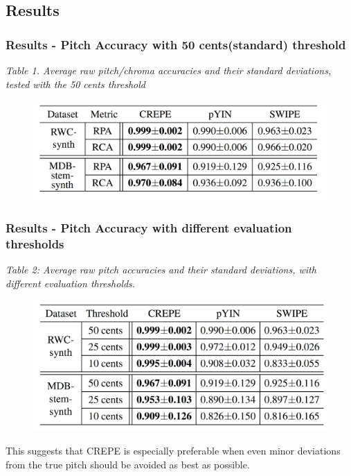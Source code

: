\documentclass{beamer}
\begin{document}
\subsection{Results}
\begin{frame}
\frametitle{Results - Pitch Accuracy with 50 cents(standard) threshold}
\textit{Table 1. Average raw pitch/chroma accuracies and their standard deviations, tested with the 50 cents threshold}
\begin{figure}
\includegraphics[width=0.9\linewidth]{Image/Table_1.png}
\end{figure}
\end{frame}
\begin{frame}
\frametitle{Results - Pitch Accuracy with different evaluation thresholds}
\textit{Table 2: Average raw pitch accuracies and their standard deviations, with different evaluation thresholds.}
\begin{figure}
\includegraphics[width=0.85\linewidth]{Image/Table_2.png}
\end{figure}
This suggests that CREPE is especially preferable when even minor deviations from the true pitch should be avoided as best as possible.
\end{frame}
\end{document}
